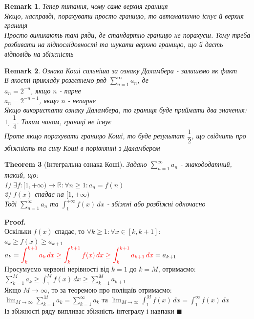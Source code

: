\documentclass[a4paper, 14pt]{extarticle}
\def\huge{\displaystyle}
\theoremstyle{theoremdd}
\newtheorem{theorem}{Theorem}[subsection]
\theoremstyle{theoremdd}
\theoremstyle{theoremdd}
\theoremstyle{theoremdd}
\theoremstyle{theoremdd}
\theoremstyle{theoremdd}
\newtheorem{remark}[theorem]{Remark}
\theoremstyle{theoremdd}
\theoremstyle{theoremdd}
\newenvironment{pf}{\vspace*{-3mm} \textbf{Proof. \\}}{$\blacksquare$}
\begin{document}
\begin{remark}
Тепер питання, чому саме верхня границя\\
Якщо, насправді, порахувати просто границю, то автоматично існує й верхня границя\\
Просто виникають такі ряди, де стандартно границю не порахуєш. Тому треба розбивати на підпослідовності та шукати верхню границю, що й дасть відповідь на збіжність
\end{remark}

\begin{remark}
Ознака Коші сильніша за ознаку Даламбера - залишемо як факт\\
В якості прикладу розглянемо ряд $\huge\sum_{n=1}^\infty a_n$, де\\
$a_n = 2^{-n}$, якщо $n$ - парне\\
$a_n = 2^{-n-1}$, якщо $n$ - непарне\\
Якщо використати ознаку Даламбера, то границя буде приймати два значення: $1$, $\dfrac{1}{4}$. Таким чином, границі не існує\\
Проте якщо порахувати границю Коші, то буде результат $\dfrac{1}{2}$, що свідчить про збіжність та силу Коші в порівнянні з Даламбером\\
\end{remark}

\begin{theorem}[Інтегральна ознака Коші]
Задано $\huge \sum_{n=1}^{\infty} a_n$ - знакододатний, такий, що:\\
1) $\exists f: [1,+\infty) \to \mathbb{R}: \forall n \geq 1: a_n = f(n)$\\
2) $f(x)$ спадає на $[1,+\infty)$\\
Тоді $\huge \sum_{n = 1}^\infty a_n$ та $\huge \int_1^{+\infty} f(x)\,dx$ -  збіжні або розбіжні одночасно
\end{theorem}

\begin{pf}
Оскільки $f(x)$ спадає, то $\forall k \geq 1: \forall x \in [k, k+1]:$\\
$a_k \geq f(x) \geq a_{k+1}$\\
$\huge a_k = \textcolor{red}{\int_k^{k+1} a_k \,dx \geq \int_k^{k+1} f(x)\,dx \geq \int_k^{k+1} a_{k+1}\,dx} = a_{k+1}$\\
Просумуємо червоні нерівності від $k = 1$ до $k = M$, отримаємо:\\
$\huge \sum_{k=1}^M a_k \geq \int_1^{M} f(x)\,dx \geq \sum_{k=1}^M a_{k+1}$\\
Якщо $M \to \infty$, то за теоремою про поліцаїв отримаємо:\\
$\huge \lim_{M \to \infty}  \sum_{k=1}^M a_{k} = \sum_{k=1}^{\infty} a_k$ та $\huge \lim_{M \to \infty} \int_1^M f(x)\,dx = \int_1^\infty f(x)\,dx$\\
Із збіжності ряду випливає збіжність інтегралу і навпаки
\end{pf}
\end{document}
